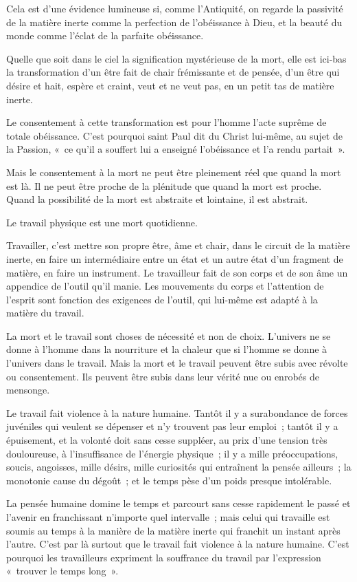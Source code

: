 \documentclass[french,twoside]{book} %
\begin{document}
Cela est d'une évidence lumineuse si, comme l'Antiquité, on regarde la passivité de la matière inerte comme la perfection de l'obéissance à Dieu, et la beauté du monde comme l'éclat de la parfaite obéissance.\par
Quelle que soit dans le ciel la signification mystérieuse de la mort, elle est ici-bas la transformation d'un être fait de chair frémissante et de pensée, d'un être qui désire et hait, espère et craint, veut et ne veut pas, en un petit tas de matière inerte.\par
Le consentement à cette transformation est pour l'homme l'acte suprême de totale obéissance. C'est pourquoi saint Paul dit du Christ lui-même, au sujet de la Passion, « ce qu'il a souffert lui a enseigné l'obéissance et l'a rendu partait ».\par
Mais le consentement à la mort ne peut être pleinement réel que quand la mort est là. Il ne peut être proche de la plénitude que quand la mort est proche. Quand la possibilité de la mort est abstraite et lointaine, il est abstrait.\par
Le travail physique est une mort quotidienne.\par
Travailler, c'est mettre son propre être, âme et chair, dans le circuit de la matière inerte, en faire un intermédiaire entre un état et un autre état d'un fragment de matière, en faire un instrument. Le travailleur fait de son corps et de son âme un appendice de l'outil qu'il manie. Les mouvements du corps et l'attention de l'esprit sont fonction des exigences de l'outil, qui lui-même est adapté à la matière du travail.\par
La mort et le travail sont choses de nécessité et non de choix. L'univers ne se donne à l'homme dans la nourriture et la chaleur que si l'homme se donne à l'univers dans le travail. Mais la mort et le travail peuvent être subis avec révolte ou consentement. Ils peuvent être subis dans leur vérité nue ou enrobés de mensonge.\par
Le travail fait violence à la nature humaine. Tantôt il y a surabondance de forces juvéniles qui veulent se dépenser et n'y trouvent pas leur emploi ; tantôt il y a épuisement, et la volonté doit sans cesse suppléer, au prix d'une tension très douloureuse, à l'insuffisance de l'énergie physique ; il y a mille préoccupations, soucis, angoisses, mille désirs, mille curiosités qui entraînent la pensée ailleurs ; la monotonie cause du dégoût ; et le temps pèse d'un poids presque intolérable.\par
La pensée humaine domine le temps et parcourt sans cesse rapidement le passé et l'avenir en franchissant n'importe quel intervalle ; mais celui qui travaille est soumis au temps à la manière de la matière inerte qui franchit un instant après l'autre. C'est par là surtout que le travail fait violence à la nature humaine. C'est pourquoi les travailleurs expriment la souffrance du travail par l'expression « trouver le temps long ».\par
\end{document}
